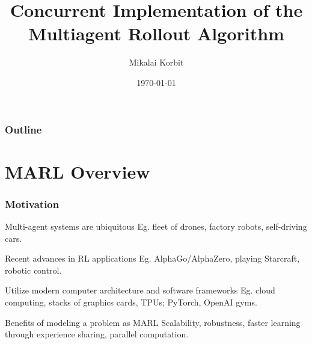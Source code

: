 \documentclass{beamer}
\title[MARL]{Concurrent Implementation 
	of the 
	Multiagent Rollout Algorithm}
\author{Mikalai Korbit}
\institute[IMT]
{
    IMT School for Advanced Studies Lucca 
}
\date{\today}
\begin{document}
    \begin{frame}
        \titlepage 
    \end{frame}

    \begin{frame}
        \frametitle{Outline}
        \tableofcontents 
    \end{frame}






    \section{MARL Overview}




    \begin{frame}
        \frametitle{Motivation}

        \begin{block}{Multi-agent systems are ubiquitous}
            Eg. fleet of drones, factory robots, self-driving cars.
        \end{block}

        \begin{block}{Recent advances in RL applications}
            Eg. AlphaGo/AlphaZero, playing Starcraft, robotic control.
        \end{block}

        \begin{block}{Utilize modern computer architecture and software frameworks}
            Eg. cloud computing, stacks of graphics cards, TPUs;
            PyTorch, OpenAI gyms.
        \end{block}

        \begin{block}{Benefits of modeling a problem as MARL}
            Scalability, robustness, faster learning through experience sharing,
            parallel computation.
        \end{block}

    \end{frame}


\end{document}
